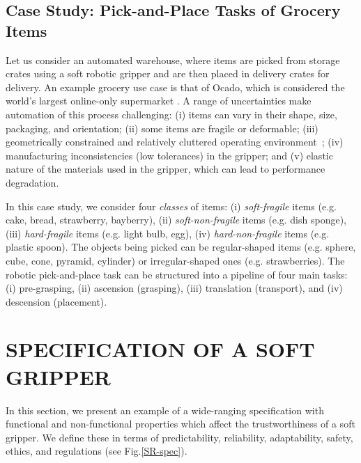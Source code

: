 \documentclass[letterpaper, 10 pt, conference]{ieeeconf}  %
\begin{document}
	
	\subsection{Case Study: Pick-and-Place Tasks of Grocery Items}
	Let us consider an automated warehouse, where items are picked from storage crates using a soft robotic gripper and are then placed in delivery crates for delivery. 
	An example grocery use case is that of Ocado, which is considered the world's largest online-only supermarket \cite{Triantafyllou2019, Sotiropoulos2018}. 
	A range of uncertainties make automation of this process challenging: (i) items can vary in their shape, size, packaging, and orientation; (ii) some items are fragile or deformable; (iii) geometrically constrained and relatively cluttered operating environment~\cite{Triantafyllou2019}; (iv) manufacturing inconsistencies (low tolerances) in the gripper; and (v) elastic nature of the materials used in the gripper, which can lead to performance degradation.
	
	In this case study, we consider four \emph{classes} of items: (i) \emph{soft-fragile} items (e.g. cake, bread, strawberry, bayberry), (ii) \emph{soft-non-fragile} items (e.g. dish sponge), (iii) \emph{hard-fragile} items (e.g. light bulb, egg), (iv) \emph{hard-non-fragile} items (e.g. plastic spoon). 
	The objects being picked can be regular-shaped items (e.g. sphere, cube, cone, pyramid, cylinder) or irregular-shaped ones (e.g. strawberries). The robotic pick-and-place task can be structured into a pipeline of four main tasks: (i) pre-grasping, (ii) ascension (grasping), (iii) translation (transport), and (iv) descension (placement). 

\section{SPECIFICATION OF A SOFT GRIPPER}\label{specification-gripper}
	In this section, we present an example of a wide-ranging specification with functional and non-functional properties which affect the trustworthiness of a soft gripper. We define these in terms of predictability, reliability, adaptability, safety, ethics, and regulations (see Fig.\ref{SR-spec}). 
	
\end{document}
